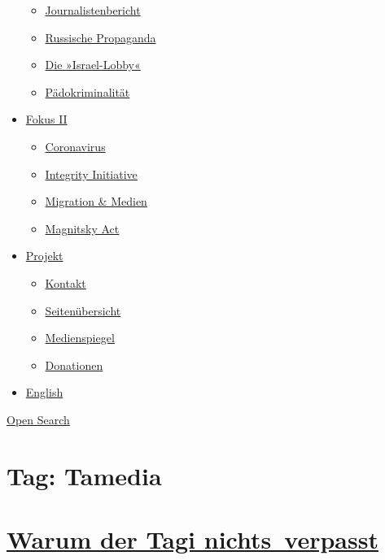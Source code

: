 \begin{itemize}
  \begin{itemize}
  \tightlist
  \item
    \href{https://swprs.org/bericht-eines-journalisten/}{Journalistenbericht}
  \item
    \href{https://swprs.org/russische-propaganda/}{Russische Propaganda}
  \item
    \href{https://swprs.org/die-israel-lobby-fakten-und-mythen/}{Die
    »Israel-Lobby«}
  \item
    \href{https://swprs.org/geopolitik-und-paedokriminalitaet/}{Pädokriminalität}
  \end{itemize}
\item
  \href{https://swprs.org/migration-und-medien/}{Fokus II}

  \begin{itemize}
  \tightlist
  \item
    \href{https://swprs.org/covid-19-hinweis-ii/}{Coronavirus}
  \item
    \href{https://swprs.org/die-integrity-initiative/}{Integrity
    Initiative}
  \item
    \href{https://swprs.org/migration-und-medien/}{Migration \& Medien}
  \item
    \href{https://swprs.org/der-fall-magnitsky/}{Magnitsky Act}
  \end{itemize}
\item
  \href{https://swprs.org/kontakt/}{Projekt}

  \begin{itemize}
  \tightlist
  \item
    \href{https://swprs.org/kontakt/}{Kontakt}
  \item
    \href{https://swprs.org/uebersicht/}{Seitenübersicht}
  \item
    \href{https://swprs.org/medienspiegel/}{Medienspiegel}
  \item
    \href{https://swprs.org/donationen/}{Donationen}
  \end{itemize}
\item
  \href{https://swprs.org/contact/}{English}
\end{itemize}

\protect\hyperlink{}{Open Search}

\hypertarget{tag-tamedia}{%
\section{Tag: Tamedia}\label{tag-tamedia}}

\hypertarget{warum-der-tagi-nichts-verpasst}{%
\section{\texorpdfstring{\href{https://swprs.org/2017/03/01/warum-der-tagesanzeiger-nichts-verpasst/}{Warum
der Tagi
nichts~verpasst}}{Warum der Tagi nichts~verpasst}}\label{warum-der-tagi-nichts-verpasst}}

